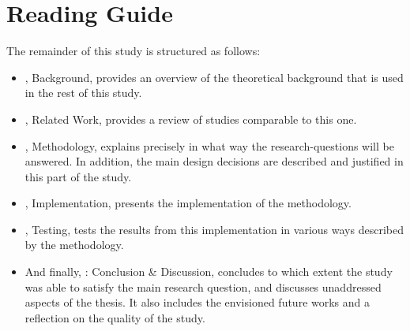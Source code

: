
\newpage
\section{Reading Guide}
The remainder of this study is structured as follows:


\begin{itemize}[ ]
  \item {}, Background, provides an overview of the theoretical background that is used in the rest of this study.
  
  \item {}, Related Work, provides a review of studies comparable to this one.

  \item {}, Methodology, explains precisely in what way the research-questions will be answered.
  In addition, the main design decisions are described and justified in this part of the study.

  \item {}, Implementation, presents the implementation of the methodology.
  
  \item {}, Testing, tests the results from this implementation in various ways described by the methodology.
  
  \item And finally, : Conclusion \& Discussion, concludes to which extent the study was able to satisfy the main research question, and discusses unaddressed aspects of the thesis.
  It also includes the envisioned future works and a reflection on the quality of the study.

\end{itemize}